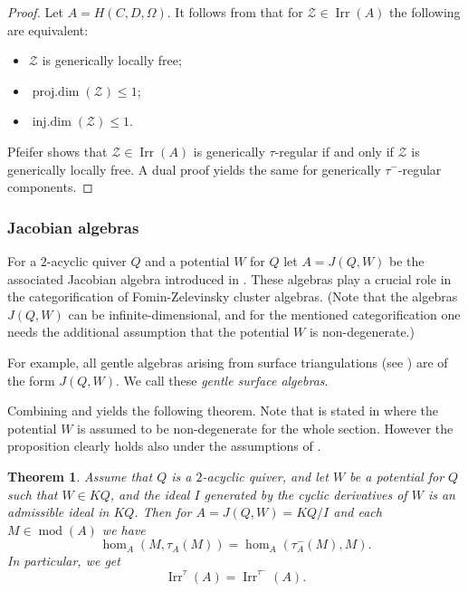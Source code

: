 \documentclass[12pt,reqno]{amsart}
\newtheorem{Thm}{Theorem}[section]
\theoremstyle{definition}
\newcommand{\md}{\operatorname{mod}}
\newcommand{\pdim}{\operatorname{proj.dim}}
\newcommand{\idim}{\operatorname{inj.dim}}
\newcommand{\irr}{\operatorname{Irr}}
\newcommand{\calZ}{\mathcal{Z}}
\begin{document}
\begin{proof}
Let $A = H(C,D,\Omega)$.
It follows from \cite[Theorem~1.2]{GLS17} that for $\calZ \in \irr(A)$ the following are equivalent:
\begin{itemize}\itemsep2mm

\item[(i)]
$\calZ$ is generically locally free;

\item[(ii)]
$\pdim(\calZ) \le 1$;

\item[(iii)]
$\idim(\calZ) \le 1$.

\end{itemize}
Pfeifer
\cite[Theorem~1.1]{Pf23}
shows that $\calZ \in \irr(A)$ is generically $\tau$-regular
if and only if $\calZ$ is generically locally free.
A dual proof yields the same for generically $\tau^-$-regular components.
\end{proof}

\subsubsection{Jacobian algebras}
For a $2$-acyclic quiver $Q$ and a potential $W$ for
$Q$ let $A = J(Q,W)$ be the associated Jacobian algebra introduced in
\cite{DWZ08}.
These algebras play a crucial role in the categorification of
Fomin-Zelevinsky cluster algebras.
(Note that the algebras $J(Q,W)$ can be infinite-dimensional, and for the
mentioned categorification one needs the additional assumption that
the potential $W$ is non-degenerate.)

For example, all gentle algebras arising from surface triangulations
(see \cite{ABCP10})
are of the form $J(Q,W)$.
We call these \emph{gentle surface algebras}.

Combining
\cite[Proposition~7.3]{DWZ10} and
\cite[Corollary~10.9]{DWZ10} yields the following
theorem.
Note that \cite[Proposition~7.3]{DWZ10}
is stated in \cite[Section~7]{DWZ10} where the potential $W$ is assumed to be non-degenerate for the whole section.
However the proposition clearly holds also under the assumptions
of \cite[Section~10]{DWZ10}.




\begin{Thm}\label{thm:jacobian}
Assume that $Q$ is a $2$-acyclic quiver, and let $W$ be a potential
for $Q$ such that
$W \in KQ$, and the ideal $I$ generated by the cyclic derivatives of $W$
is an admissible ideal in $KQ$.
Then for $A = J(Q,W) = KQ/I$ and each
$M \in \md(A)$ we have
$$
\hom_A(M,\tau_A(M)) = \hom_A(\tau_A^-(M),M).
$$
In particular, we get
$$
\irr^\tau(A) = \irr^{\tau^-}(A).
$$
\end{Thm}
\end{document}
